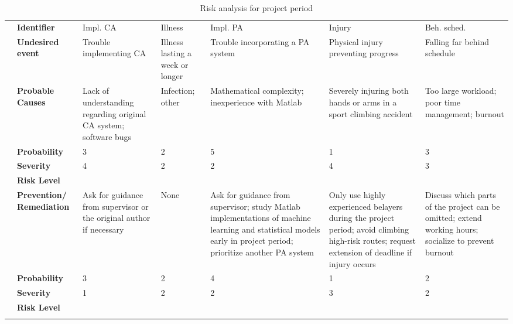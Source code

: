 \documentclass[informationsecurity]{gucmasterproject}
\begin{document}
\begin{table}[H]
\scriptsize
\caption{Risk analysis for project period}
\label{tab:risk-analysis}
\begin{tabular}{c| p{1.3cm}|p{1.5cm}|p{0.94cm}|p{2.5cm}|p{2.2cm}|p{1.7cm}|}
\hhline{~|------}
& \bf Identifier & Impl. CA & Illness & Impl. PA & Injury & Beh. sched.\\ \hhline{~|------|}
\bf & \bf Undesired event & Trouble implementing CA & Illness lasting a week or longer & Trouble incorporating a PA system & Physical injury preventing progress & Falling far behind schedule\\ \hhline{~|------|} 
& \bf Probable Causes & Lack of understanding regarding original CA system; software bugs & Infection; other & Mathematical complexity; inexperience with Matlab & Severely injuring both hands or arms in a sport climbing accident & Too large workload; poor time management; burnout\\ \hhline{~|------|}
\multirow{3}{*}{\rotatebox{90}{\tiny INITIAL\,}} & \bf Probability & 3 & 2 & 5 & 1 & 3  \\ \hhline{~|------|}
& \bf Severity & 4 & 2 & 2 & 4 & 3 \\ \hhline{~|------|}
& \bf Risk Level & \cellcolor{red!50} & \cellcolor{green!50} & \cellcolor{red!50} & \cellcolor{yellow!50} & \cellcolor{yellow!50}\\ \hhline{~|------|}
& \bf Prevention/ Remediation& Ask for guidance from supervisor or the original author if necessary & None & Ask for guidance from supervisor; study Matlab implementations of machine learning and statistical models early in project period; prioritize another PA system & Only use highly experienced belayers during the project period; avoid climbing high-risk routes; request extension of deadline if injury occurs & Discuss which parts of the project can be omitted; extend working hours; socialize to prevent burnout\\ \hhline{~|------|}
\multirow{3}{*}{\rotatebox{90}{\tiny RESIDUAL\,}}& \bf Probability & 3 & 2 & 4 & 1 & 2\\ \hhline{~|------|}
& \bf Severity & 1 & 2 & 2 & 3 & 2\\ \hhline{~|------|}
& \bf Risk Level & \cellcolor{green!50} & \cellcolor{green!50} & \cellcolor{yellow!50} & \cellcolor{green!50} & \cellcolor{green!50}\\
\hhline{~|------|}


\end{tabular}
\end{table}
\end{document}
